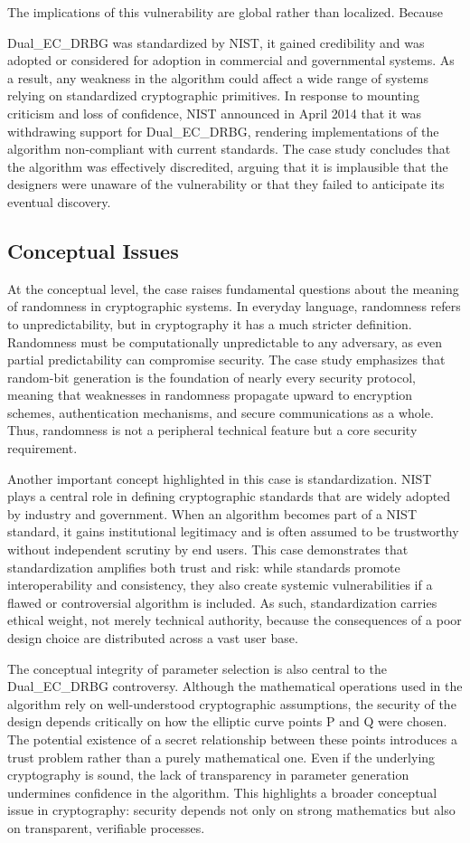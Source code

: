 \documentclass[12pt,letterpaper]{article}
\begin{document}
The implications of this vulnerability are global rather than localized. Because 

Dual\_EC\_DRBG was standardized by NIST, it gained credibility and was adopted or considered for adoption in commercial and governmental systems. As a result, any weakness in the algorithm could affect a wide range of systems relying on standardized cryptographic primitives. In response to mounting criticism and loss of confidence, NIST announced in April 2014 that it was withdrawing support for Dual\_EC\_DRBG, rendering implementations of the algorithm non-compliant with current standards. The case study concludes that the algorithm was effectively discredited, arguing that it is implausible that the designers were unaware of the vulnerability or that they failed to anticipate its eventual discovery.

\subsection{Conceptual Issues}
At the conceptual level, the case raises fundamental questions about the meaning of randomness in cryptographic systems. In everyday language, randomness refers to unpredictability, but in cryptography it has a much stricter definition. Randomness must be computationally unpredictable to any adversary, as even partial predictability can compromise security. The case study emphasizes that random-bit generation is the foundation of nearly every security protocol, meaning that weaknesses in randomness propagate upward to encryption schemes, authentication mechanisms, and secure communications as a whole. Thus, randomness is not a peripheral technical feature but a core security requirement.

Another important concept highlighted in this case is standardization. NIST plays a central role in defining cryptographic standards that are widely adopted by industry and government. When an algorithm becomes part of a NIST standard, it gains institutional legitimacy and is often assumed to be trustworthy without independent scrutiny by end users. This case demonstrates that standardization amplifies both trust and risk: while standards promote interoperability and consistency, they also create systemic vulnerabilities if a flawed or controversial algorithm is included. As such, standardization carries ethical weight, not merely technical authority, because the consequences of a poor design choice are distributed across a vast user base.

The conceptual integrity of parameter selection is also central to the Dual\_EC\_DRBG controversy. Although the mathematical operations used in the algorithm rely on well-understood cryptographic assumptions, the security of the design depends critically on how the elliptic curve points P and Q were chosen. The potential existence of a secret relationship between these points introduces a trust problem rather than a purely mathematical one. Even if the underlying cryptography is sound, the lack of transparency in parameter generation undermines confidence in the algorithm. This highlights a broader conceptual issue in cryptography: security depends not only on strong mathematics but also on transparent, verifiable processes.
\end{document}
